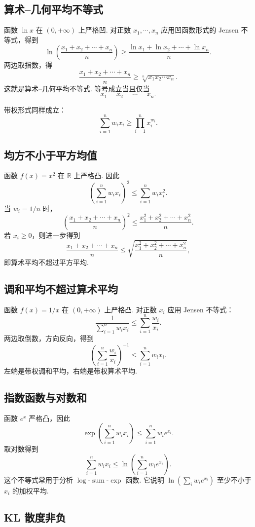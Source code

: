 \documentclass[UTF8,12pt,a4paper,fontset=fandol]{ctexart}
\begin{document}
\subsection*{算术--几何平均不等式}

函数 $\ln x$ 在 $(0,+\infty)$ 上严格凹. 对正数 $x_1,\cdots,x_n$ 应用凹函数形式的 Jensen 不等式，得到
\[
  \ln\left(\frac{x_1+x_2+\cdots+x_n}{n}\right)
  \ge
  \frac{\ln x_1+\ln x_2+\cdots+\ln x_n}{n}.
\]
两边取指数，得
\[
  \frac{x_1+x_2+\cdots+x_n}{n}
  \ge
  \sqrt[n]{x_1x_2\cdots x_n}.
\]
这就是算术--几何平均不等式. 等号成立当且仅当
\[
  x_1=x_2=\cdots=x_n.
\]

带权形式同样成立：
\[
  \sum_{i=1}^n w_ix_i
  \ge
  \prod_{i=1}^n x_i^{w_i}.
\]

\subsection*{均方不小于平方均值}

函数 $f(x)=x^2$ 在 $\mathbb R$ 上严格凸. 因此
\[
  \left(\sum_{i=1}^n w_ix_i\right)^2
  \le
  \sum_{i=1}^n w_ix_i^2.
\]
当 $w_i=1/n$ 时，
\[
  \left(\frac{x_1+x_2+\cdots+x_n}{n}\right)^2
  \le
  \frac{x_1^2+x_2^2+\cdots+x_n^2}{n}.
\]
若 $x_i\ge0$，则进一步得到
\[
  \frac{x_1+x_2+\cdots+x_n}{n}
  \le
  \sqrt{\frac{x_1^2+x_2^2+\cdots+x_n^2}{n}},
\]
即算术平均不超过平方平均.

\subsection*{调和平均不超过算术平均}

函数 $f(x)=1/x$ 在 $(0,+\infty)$ 上严格凸. 对正数 $x_i$ 应用 Jensen 不等式：
\[
  \frac{1}{\sum_{i=1}^n w_ix_i}
  \le
  \sum_{i=1}^n \frac{w_i}{x_i}.
\]
两边取倒数，方向反向，得到
\[
  \left(\sum_{i=1}^n \frac{w_i}{x_i}\right)^{-1}
  \le
  \sum_{i=1}^n w_ix_i.
\]
左端是带权调和平均，右端是带权算术平均.

\subsection*{指数函数与对数和}

函数 $e^x$ 严格凸，因此
\[
  \exp\left(\sum_{i=1}^n w_ix_i\right)
  \le
  \sum_{i=1}^n w_ie^{x_i}.
\]
取对数得到
\[
  \sum_{i=1}^n w_ix_i
  \le
  \ln\left(\sum_{i=1}^n w_ie^{x_i}\right).
\]
这个不等式常用于分析 $\log$-$\operatorname{sum}$-$\exp$ 函数. 它说明 $\ln(\sum_iw_ie^{x_i})$ 至少不小于 $x_i$ 的加权平均.

\subsection*{KL 散度非负}
\end{document}
